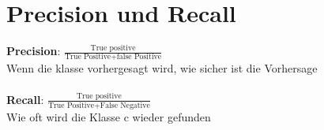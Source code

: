 \documentclass{article}
\begin{document}
\section{Precision und Recall}
\textbf{Precision}: $\frac{\text{True positive}}{\text{True Positive} + 
\text{false Positive}}$ \\
Wenn die klasse vorhergesagt wird, wie sicher ist die Vorhersage \\
\\
\textbf{Recall}: $\frac{\text{True positive}}{\text{True Positive} + 
\text{False Negative}}$ \\
Wie oft wird die Klasse c wieder gefunden
\end{document}
